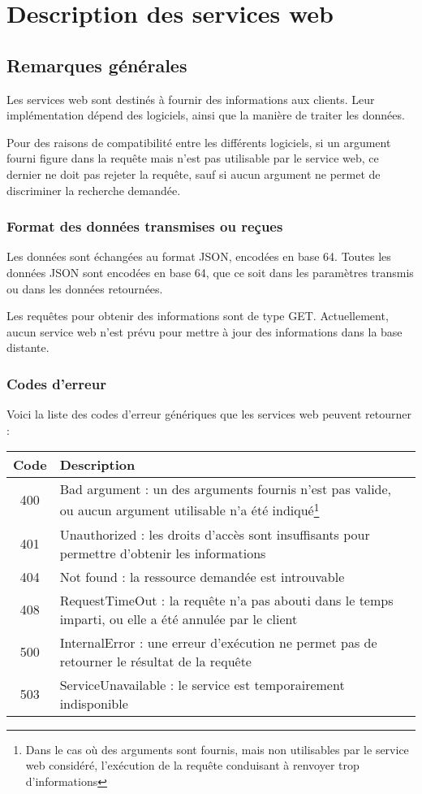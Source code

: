 \chapter{Description des services web}

\section{Remarques générales}

Les services web sont destinés à fournir des informations aux clients. Leur implémentation dépend des logiciels, ainsi que la manière de traiter les données.

Pour des raisons de compatibilité entre les différents logiciels, si un argument fourni figure dans la requête mais n'est pas utilisable par le service web, ce dernier ne doit pas rejeter la requête, sauf si aucun argument ne permet de discriminer la recherche demandée.

\subsection{Format des données transmises ou reçues}
Les données sont échangées au format JSON, encodées en base 64. Toutes les données JSON sont encodées en base 64, que ce soit dans les paramètres transmis ou dans les données retournées.

Les requêtes pour obtenir des informations sont de type GET. Actuellement, aucun service web n'est prévu pour mettre à jour des informations dans la base distante.

\subsection{Codes d'erreur}

Voici la liste des codes d'erreur génériques que les services web peuvent retourner :
\begin{longtable}{|c|>{\raggedright\arraybackslash}p{12cm}|}
\hline 
Code &  Description \\ 
\hline \endhead
400 & Bad argument : un des arguments fournis n'est pas valide, ou aucun argument utilisable n'a été indiqué\footnote{Dans le cas où des arguments sont fournis, mais non utilisables par le service web considéré, l'exécution de la requête conduisant à renvoyer trop d'informations} \\
\hline
401 & Unauthorized : les droits d'accès sont insuffisants pour permettre d'obtenir les informations \\
\hline
404 & Not found : la ressource demandée est introuvable\\
\hline
408 & RequestTimeOut : la requête n'a pas abouti dans le temps imparti, ou elle a été annulée par le client\\
\hline
500 & InternalError : une erreur d'exécution ne permet pas de retourner le résultat de la requête\\
\hline
503 & ServiceUnavailable : le service est temporairement indisponible\\
\hline
\end{longtable} 


